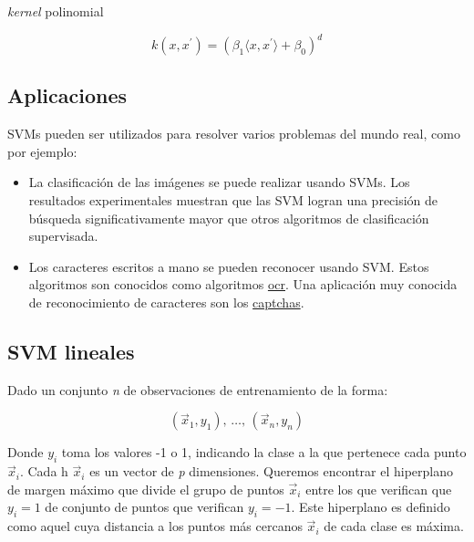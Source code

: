 \documentclass[12pt,spanish,a4paper]{article}
\numberwithin{equation}{section}
\begin{document}
\emph{kernel} polinomial

\begin{equation}
k\left(x, x^{\prime}\right) = \left(\beta_1 \langle x, x^{\prime}\rangle + \beta_0\right)^{d}
\end{equation}

\hypertarget{aplicaciones}{%
\subsection{Aplicaciones}\label{aplicaciones}}

SVMs pueden ser utilizados para resolver varios problemas del mundo
real, como por ejemplo:

\begin{itemize}
\item
  La clasificación de las imágenes se puede realizar usando SVMs. Los
  resultados experimentales muestran que las SVM logran una precisión de
  búsqueda significativamente mayor que otros algoritmos de
  clasificación supervisada.
\item
  Los caracteres escritos a mano se pueden reconocer usando SVM. Estos
  algoritmos son conocidos como algoritmos
  \href{https://en.wikipedia.org/wiki/Optical_character_recognition}{ocr}.
  Una aplicación muy conocida de reconocimiento de caracteres son los
  \href{https://en.wikipedia.org/wiki/CAPTCHA}{captchas}.
\end{itemize}

\hypertarget{svm-lineales}{%
\subsection{SVM lineales}\label{svm-lineales}}

Dado un conjunto \emph{n} de observaciones de entrenamiento de la forma:

\begin{equation}
({\vec {x}}_{1},y_{1}),\,\ldots ,\,({\vec {x}}_{n},y_{n})
\end{equation}

Donde \({\displaystyle y_{i}}\) toma los valores -1 o 1, indicando la
clase a la que pertenece cada punto \({\displaystyle {\vec {x}}_{i}}\).
Cada h \({\displaystyle {\vec {x}}_{i}}\) es un vector de \emph{p}
dimensiones. Queremos encontrar el hiperplano de margen máximo que
divide el grupo de puntos \({\displaystyle {\vec {x}}_{i}}\) entre los
que verifican que \({\displaystyle y_{i} = 1}\) de conjunto de puntos
que verifican \({\displaystyle y_{i} = -1}\). Este hiperplano es
definido como aquel cuya distancia a los puntos más cercanos
\({\displaystyle {\vec {x}}_{i}}\) de cada clase es máxima.
\end{document}
